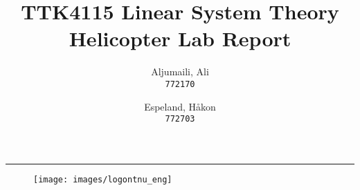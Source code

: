 \documentclass{article}
\title{TTK4115 Linear System Theory\\  Helicopter Lab Report}
\author{
  Aljumaili, Ali\\
  \texttt{772170}
  \and
  Espeland, Håkon\\
  \texttt{772703}\\
  }
\date{\parbox{\linewidth}{\centering%
  \today\endgraf\bigskip
  Group 63
  }}
\begin{document}
\begin{titlepage}
    \maketitle
    \rule{\linewidth}{0.5mm}
    
    \begin{figure}
    \centering
    \texttt{[image: images/logontnu\_eng]}
    \end{figure}
    \thispagestyle{empty}
\end{titlepage}

\tableofcontents
\listoffigures
\thispagestyle{empty} %
\newpage    



\setcounter{page}{1}






\end{document}
